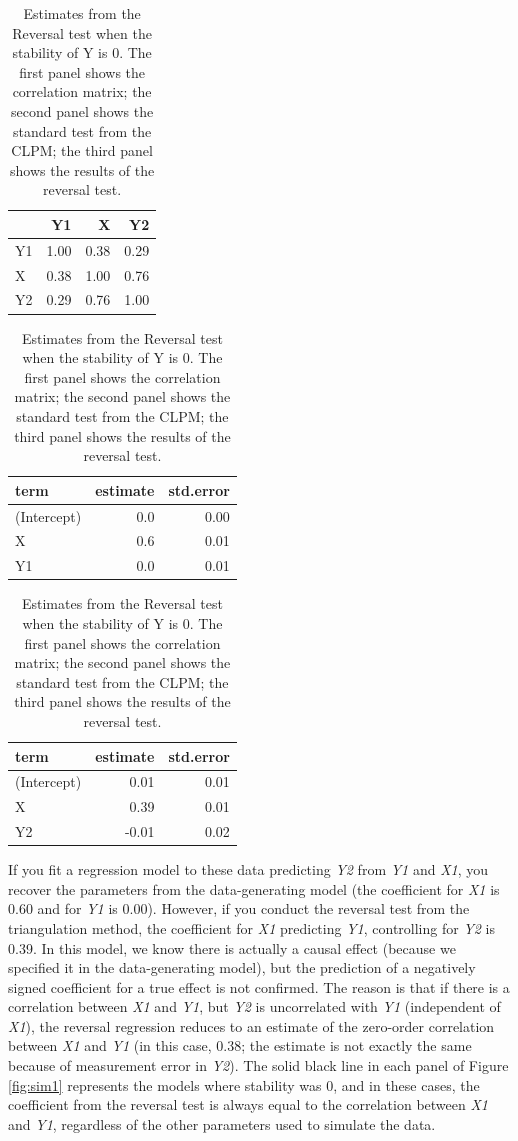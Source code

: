 \documentclass[
  man,floatsintext]{apa6}
\begin{document}
\begin{table}
\caption{\label{tab:example}Estimates from the Reversal test when the stability of Y is 0. The first panel shows the correlation matrix; the second panel shows the standard test from the CLPM; the third panel shows the results of the reversal test.}

\centering
\begin{tabular}[t]{lrrr}
\toprule
  & Y1 & X & Y2\\
\midrule
Y1 & 1.00 & 0.38 & 0.29\\
X & 0.38 & 1.00 & 0.76\\
Y2 & 0.29 & 0.76 & 1.00\\
\bottomrule
\end{tabular}
\centering
\begin{tabular}[t]{lrr}
\toprule
term & estimate & std.error\\
\midrule
(Intercept) & 0.0 & 0.00\\
X & 0.6 & 0.01\\
Y1 & 0.0 & 0.01\\
\bottomrule
\end{tabular}
\centering
\begin{tabular}[t]{lrr}
\toprule
term & estimate & std.error\\
\midrule
(Intercept) & 0.01 & 0.01\\
X & 0.39 & 0.01\\
Y2 & -0.01 & 0.02\\
\bottomrule
\end{tabular}
\end{table}

If you fit a regression model to these data predicting \emph{Y2} from \emph{Y1} and \emph{X1}, you recover the parameters from the data-generating model (the coefficient for \emph{X1} is 0.60 and for \emph{Y1} is 0.00). However, if you conduct the reversal test from the triangulation method, the coefficient for \emph{X1} predicting \emph{Y1}, controlling for \emph{Y2} is 0.39. In this model, we know there is actually a causal effect (because we specified it in the data-generating model), but the prediction of a negatively signed coefficient for a true effect is not confirmed. The reason is that if there is a correlation between \emph{X1} and \emph{Y1}, but \emph{Y2} is uncorrelated with \emph{Y1} (independent of \emph{X1}), the reversal regression reduces to an estimate of the zero-order correlation between \emph{X1} and \emph{Y1} (in this case, 0.38; the estimate is not exactly the same because of measurement error in \emph{Y2}). The solid black line in each panel of Figure \ref{fig:sim1} represents the models where stability was 0, and in these cases, the coefficient from the reversal test is always equal to the correlation between \emph{X1} and \emph{Y1}, regardless of the other parameters used to simulate the data.
\end{document}
